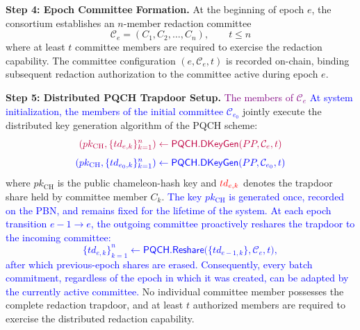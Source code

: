 \documentclass[lettersize,journal]{IEEEtran}
\begin{document}
\textbf{Step 4: Epoch Committee Formation.}
At the beginning of epoch $e$, the consortium establishes an
$n$-member redaction committee
\begin{equation}
\mathcal{C}_e={(C_1,C_2,\ldots,C_n)}, \qquad t\leq n
\end{equation}
where at least $t$ committee members are required to exercise the
redaction capability. The committee configuration
$(e,\mathcal{C}_e,t)$ is recorded on-chain, binding subsequent
redaction authorization to the committee active during epoch $e$.

\textbf{Step 5: Distributed PQCH Trapdoor Setup.}
\textcolor{purple}{The members of $\mathcal{C}_e$}\textcolor{blue}{ At system initialization, the members of the initial committee $\mathcal{C}_{e_0}$} jointly execute the distributed key
generation algorithm of the PQCH scheme:
\begin{equation}
{\color{purple}(pk_{\mathrm{CH}},\{td_{e,k}\}_{k=1}^{n})
\leftarrow
\mathsf{PQCH.DKeyGen}(PP,\mathcal{C}_e,t)}
\end{equation}
\begin{equation}
{\color{blue}(pk_{\mathrm{CH}},\{td_{e_0,k}\}_{k=1}^{n})
\leftarrow
\mathsf{PQCH.DKeyGen}(PP,\mathcal{C}_{e_0},t)}
\end{equation}
where $pk_{\mathrm{CH}}$ is the public chameleon-hash key and
$\textcolor{red}{td_{e,k}}$ denotes the trapdoor share held by committee member $C_k$.
\textcolor{blue}{The key $pk_{\mathrm{CH}}$ is generated once, recorded on
the PBN, and remains fixed for the lifetime of the system. At each epoch
transition $e-1\rightarrow e$, the outgoing committee proactively reshares
the trapdoor to the incoming committee:
\begin{equation}
\{td_{e,k}\}_{k=1}^{n}\leftarrow
\mathsf{PQCH.Reshare}\big(\{td_{e-1,k}\},\mathcal{C}_e,t\big),
\end{equation}
after which previous-epoch shares are erased. Consequently, every batch
commitment, regardless of the epoch in which it was created, can be
adapted by the currently active committee.}
No individual committee member possesses the complete redaction
trapdoor, and at least $t$ authorized members are required to exercise
the distributed redaction capability.
\end{document}
